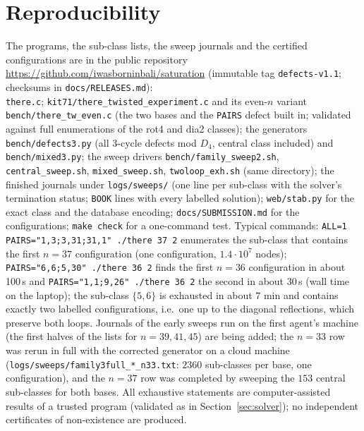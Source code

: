 \documentclass[11pt]{article}
\theoremstyle{remark}
\newcommand{\Dfour}{D_4}
\begin{document}
\section{Reproducibility}
The programs, the sub-class lists, the sweep journals and the certified configurations are in the public repository
\url{https://github.com/iwasborninbali/saturation} (immutable tag \texttt{defects-v1.1}; checksums in
\texttt{docs/RELEASES.md}):\\
\texttt{there.c}; \texttt{kit71/there\_twisted\_experiment.c} and its even-$n$ variant \texttt{bench/there\_tw\_even.c}
(the two bases and the \texttt{PAIRS} defect built in; validated against full enumerations of the rot4 and dia2 classes);
the generators \texttt{bench/defects3.py} (all $3$-cycle defects mod $\Dfour$, central class included) and
\texttt{bench/mixed3.py}; the sweep drivers \texttt{bench/family\_sweep2.sh}, \texttt{central\_sweep.sh},
\texttt{mixed\_sweep.sh}, \texttt{twoloop\_exh.sh} (same directory); the finished journals under \texttt{logs/sweeps/} (one line
per sub-class with the solver's termination status; \texttt{BOOK} lines with every labelled solution); \texttt{web/stab.py}
for the exact class and the database encoding; \texttt{docs/SUBMISSION.md} for the configurations; \texttt{make check} for a
one-command test.  Typical commands: \texttt{ALL=1 PAIRS="1,3;3,31;31,1" ./there 37 2} enumerates the sub-class that
contains the first $n=37$ configuration (one configuration, $1.4\cdot10^7$ nodes); \texttt{PAIRS="6,6;5,30" ./there 36 2}
finds the first $n=36$ configuration in about 100\,s and \texttt{PAIRS="1,1;9,26" ./there 36 2} the second in about 30\,s
(wall time on the laptop); the sub-class $\{5,6\}$ is exhausted in about $7$ min and contains exactly two labelled
configurations, i.e.\ one up to the diagonal reflections, which preserve both loops.  Journals of the early sweeps run on the
first agent's machine (the first halves of the lists for $n=39,41,45$) are being added; the $n=33$ row was rerun in full with
the corrected generator on a cloud machine (\texttt{logs/sweeps/family3full\_*\_n33.txt}: $2360$ sub-classes per base, one
configuration), and the $n=37$ row was completed by sweeping the $153$ central sub-classes for both bases.  All exhaustive statements are
computer-assisted results of a trusted program (validated as in Section~\ref{sec:solver}); no independent certificates of
non-existence are produced.
\end{document}

